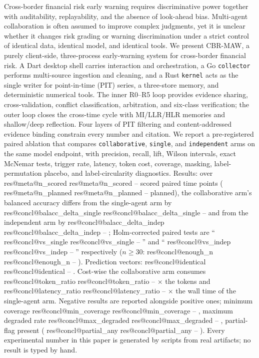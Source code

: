 \documentclass[UTF8,fontset=fandol,11pt,a4paper]{ctexart}
\makeatletter
\newcommand{\RESULT}[2]{%
  \ifcsname res@#1@#2\endcsname
    \csname res@#1@#2\endcsname
  \else
    --%
  \fi}
\makeatother
\begin{document}
\vspace{1.4em}
\par\vspace{0.6em}
\begingroup\small
Cross-border financial risk early warning requires discriminative power together with
auditability, replayability, and the absence of look-ahead bias. Multi-agent collaboration
is often assumed to improve complex judgments, yet it is unclear whether it changes risk
grading or warning discrimination under a strict control of identical data, identical model,
and identical tools. We present CBR-MAW, a purely client-side, three-process early-warning
system for cross-border financial risk. A Dart desktop shell carries interaction and
orchestration, a Go \texttt{collector} performs multi-source ingestion and cleaning, and a
Rust \texttt{kernel} acts as the single writer for point-in-time (PIT) series, a three-store
memory, and deterministic numerical tools. The inner R0--R5 loop provides evidence sharing,
cross-validation, conflict classification, arbitration, and six-class verification; the outer
loop closes the cross-time cycle with MI/LLR/HLR memories and shallow/deep reflection.
Four layers of PIT filtering and content-addressed evidence binding constrain every number and
citation. We report a pre-registered paired ablation that compares \texttt{collaborative},
\texttt{single}, and \texttt{independent} arms on the same model endpoint, with precision,
recall, lift, Wilson intervals, exact McNemar tests, trigger rate, latency, token cost,
coverage, masking, label-permutation placebo, and label-circularity diagnostics.
Results: over \RESULT{meta}{n_scored} scored paired time points (\RESULT{meta}{n_planned}
planned), the collaborative arm's balanced accuracy differs from the single-agent arm by
\RESULT{concl}{balacc_delta_single} and from the independent arm by
\RESULT{concl}{balacc_delta_indep}; Holm-corrected paired tests are
``\RESULT{concl}{vs_single}'' and ``\RESULT{concl}{vs_indep}'' respectively
($n\ge 30$: \RESULT{concl}{enough_n}). Prediction vectors: \RESULT{concl}{identical}.
Cost-wise the collaborative arm consumes \RESULT{concl}{token_ratio}$\times$ the tokens and
\RESULT{concl}{latency_ratio}$\times$ the wall time of the single-agent arm. Negative results
are reported alongside positive ones; minimum coverage \RESULT{concl}{min_coverage},
maximum degraded rate \RESULT{concl}{max_degraded}, partial-flag present
(\RESULT{concl}{partial_any}). Every experimental number in this paper is generated by scripts
from real artifacts; no result is typed by hand.
\endgroup
\end{document}
